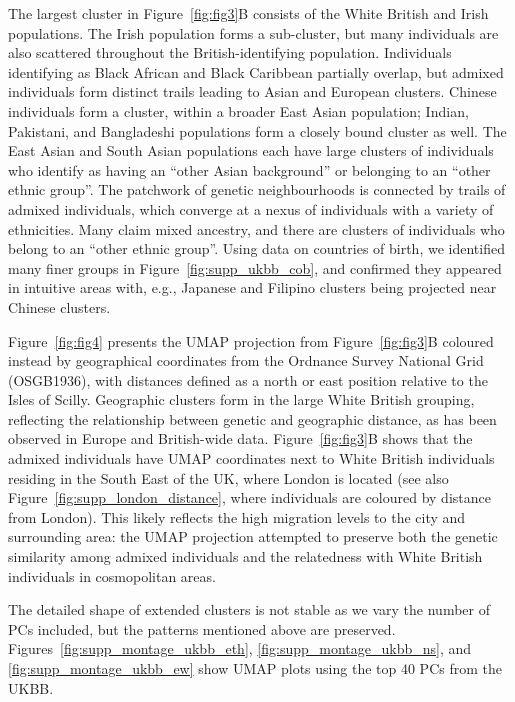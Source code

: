 The largest cluster in Figure~\ref{fig:fig3}B consists of the White British and Irish populations. The Irish population forms a sub-cluster, but many individuals are also scattered throughout the British-identifying population. Individuals identifying as Black African and Black Caribbean partially overlap, but admixed individuals form distinct trails leading to Asian and European clusters. Chinese individuals form a cluster, within a broader East Asian population; Indian, Pakistani, and Bangladeshi populations form a closely bound cluster as well. The East Asian and South Asian populations each have large clusters of individuals who identify as having an ``other Asian background'' or belonging to an ``other ethnic group''. The patchwork of genetic neighbourhoods is connected by trails of admixed individuals, which converge at a nexus of individuals with a variety of ethnicities. Many claim mixed ancestry, and there are clusters of individuals who belong to an ``other ethnic group''. Using data on countries of birth, we identified many finer groups in Figure~\ref{fig:supp_ukbb_cob}, and confirmed they appeared in intuitive areas with, e.g., Japanese and Filipino clusters being projected near Chinese clusters.

Figure~\ref{fig:fig4} presents the UMAP projection from Figure~\ref{fig:fig3}B coloured instead by geographical coordinates from the Ordnance Survey National Grid (OSGB1936), with distances defined as a north or east position relative to the Isles of Scilly. Geographic clusters form in the large White British grouping, reflecting the relationship between genetic and geographic distance, as has been observed in Europe and British-wide data\citep{novembre2008europe,leslie2015fine}. Figure~\ref{fig:fig3}B shows that the admixed individuals have UMAP coordinates next to White British individuals residing in the South East of the UK, where London is located (see also Figure~\ref{fig:supp_london_distance}, where individuals are coloured by distance from London). This likely reflects the high migration levels to the city and surrounding area: the UMAP projection attempted to preserve both the genetic similarity among admixed individuals and the relatedness with White British individuals in cosmopolitan areas. 

The detailed shape of extended clusters is not stable as we vary the number of PCs included, but the patterns mentioned above are preserved. Figures~\ref{fig:supp_montage_ukbb_eth}, \ref{fig:supp_montage_ukbb_ns}, and \ref{fig:supp_montage_ukbb_ew} show UMAP plots using the top $40$ PCs from the UKBB.

